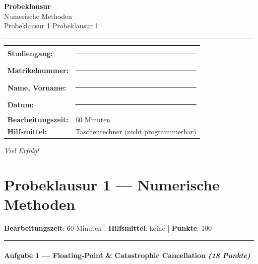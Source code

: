 \documentclass[11pt, a4paper]{article}
\providecommand{\nichttitle}{Probeklausur}
\providecommand{\nichtsubtitle}{}
\renewcommand{\nichttitle}{Numerische Methoden}
\renewcommand{\nichtsubtitle}{Probeklausur 1}
\begin{document}
\thispagestyle{empty}
\begin{center}
\vspace*{1cm}
{\Huge\bfseries\color{accent}Probeklausur}\\[8pt]
{\Large\color{accent}\nichttitle}\\[4pt]
\ifx\nichtsubtitle\empty\else
  {\large\color{accent!80!black}\nichtsubtitle}\\[6pt]
\fi
\color{accent}\rule{0.5\linewidth}{1pt}\color{black}
\end{center}

\vspace{1cm}
\begin{tabularx}{\textwidth}{@{}l X@{}}
\textbf{Studiengang:}      & \rule{6cm}{0.4pt} \\[6pt]
\textbf{Matrikelnummer:}    & \rule{6cm}{0.4pt} \\[6pt]
\textbf{Name, Vorname:}    & \rule{6cm}{0.4pt} \\[6pt]
\textbf{Datum:}             & \rule{6cm}{0.4pt} \\[6pt]
\textbf{Bearbeitungszeit:}  & 60 Minuten \\[6pt]
\textbf{Hilfsmittel:}       & Taschenrechner (nicht programmierbar) \\
\end{tabularx}

\vspace{2cm}
\begin{center}
{\large\itshape Viel Erfolg!}
\end{center}

\newpage


\section{Probeklausur 1 — Numerische Methoden}

\textbf{Bearbeitungszeit}: 60 Minuten | \textbf{Hilfsmittel}: keine | \textbf{Punkte}: 100



\noindent\textcolor{rulegray}{\rule{\linewidth}{0.4pt}}


\paragraph{Aufgabe 1 — Floating-Point \& Catastrophic Cancellation \textit{(18 Punkte)}}\mbox{}\\[2pt]
\end{document}
